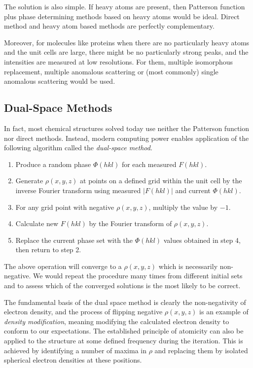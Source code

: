 \documentclass{article}
\theoremstyle{plain}\theoremheaderfont{\normalfont\itshape}\theorembodyfont{\rmfamily}\theoremseparator{.}\newtheorem*{rem}{Remark}\newtheorem*{ex}{Example}\newtheorem*{proof}{Proof}\newtheorem*{altp}{Alternative proof}
\theoremstyle{plain}\theoremheaderfont{\normalfont\bfseries}\theorembodyfont{\rmfamily}\theoremseparator{.}\newtheorem{thm}{Theorem}[section]\newtheorem{lem}[thm]{Lemma}\newtheorem{prop}[thm]{Proposition}\newtheorem*{cor}{Corollary}\newtheorem{defn}[thm]{Definition}\newtheorem{clm}[thm]{Claim}\newtheorem{clminproof}{Claim}\newtheorem*{law}{Law}\newtheorem{pos}[thm]{Postulate}
\theoremstyle{break}\theoremheaderfont{\normalfont\itshape}\theorembodyfont{\rmfamily}\theoremseparator{.\medskip}\newtheorem*{proofskip}{Proof}\newtheorem*{exs}{Examples}\newtheorem*{rems}{Remarks}
\theoremstyle{break}\theoremheaderfont{\normalfont\bfseries}\theorembodyfont{\rmfamily}\theoremseparator{.\medskip}\newtheorem{lemskip}[thm]{Lemma}\newtheorem{defnskip}[thm]{Definition}\newtheorem{propskip}[thm]{Proposition}\newtheorem{thmskip}[thm]{Theorem}
\numberwithin{equation}{section}
\newcommand{\abs}[1]{\left| #1 \right|}
\begin{document}
    The solution is also simple. If heavy atoms are present, then Patterson function plus phase determining methods based on heavy atoms would be ideal. Direct method and heavy atom based methods are perfectly complementary.
    
    Moreover, for molecules like proteins when there are no particularly heavy atoms and the unit cells are large, there might be no particularly strong peaks, and the intensities are measured at low resolutions. For them, multiple isomorphous replacement, multiple anomalous scattering or (most commonly) single anomalous scattering would be used.

    \subsection{Dual-Space Methods}
    In fact, most chemical structures solved today use neither the Patterson function nor direct methods. Instead, modern computing power enables application of the following algorithm called the \textit{dual-space method}.

    \begin{enumerate}
        \item Produce a random phase \(\Phi(hkl)\) for each measured \(F(hkl)\).
        \item Generate \(\rho(x,y,z)\) at points on a defined grid within the unit cell by the inverse Fourier transform using measured \(\abs{F(hkl)}\) and current \(\Phi(hkl)\).
        \item For any grid point with negative \(\rho(x,y,z)\), multiply the value by \(-1\).
        \item Calculate new \(F(hkl)\) by the Fourier transform of \(\rho(x,y,z)\).
        \item Replace the current phase set with the \(\Phi(hkl)\) values obtained in step 4, then return to step 2.
    \end{enumerate}

    The above operation will converge to a \(\rho(x,y,z)\) which is necessarily non-negative. We would repeat the procedure many times from different initial sets and to assess which of the converged solutions is the most likely to be correct.

    The fundamental basis of the dual space method is clearly the non-negativity of electron density, and the process of flipping negative \(\rho(x,y,z)\) is an example of \textit{density modification}, meaning modifying the calculated electron density to conform to our expectations. The established principle of atomicity can also be applied to the structure at some defined frequency during the iteration. This is achieved by identifying a number of maxima in \(\rho\) and replacing them by isolated spherical electron densities at these positions.
\end{document}
